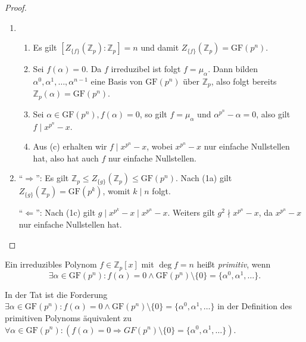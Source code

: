 \begin{proof}{\ }
    \begin{enumerate}
        \item \begin{enumerate}
            \item Es gilt $[Z_{\{f\}}(\mathbb{Z}_p) : \mathbb{Z}_p] = n$ und damit $Z_{\{f\}}(\mathbb{Z}_p) = \mathrm{GF}(p^n)$.
            \item Sei $f(\alpha) = 0$. Da $f$ irreduzibel ist folgt $f = \mu_\alpha$. Dann bilden $\alpha^0, \alpha^1, \hdots, \alpha^{n-1}$ eine Basis von $\mathrm{GF}(p^n)$ über $\mathbb{Z}_p$, also folgt bereits $\mathbb{Z}_p(\alpha) = \mathrm{GF}(p^n)$.
            \item Sei $\alpha \in \mathrm{GF}(p^n), f(\alpha) = 0$, so gilt $f = \mu_\alpha$ und $\alpha^{p^n} - \alpha = 0$, also gilt $f \mid x^{p^n} - x$.
            \item Aus (c) erhalten wir $f \mid x^{p^n} - x$, wobei $x^{p^n} - x$ nur einfache Nullstellen hat, also hat auch $f$ nur einfache Nullstellen.
        \end{enumerate}
        \item ``$\Rightarrow$'': Es gilt $\mathbb{Z}_p \leq Z_{\{g\}}(\mathbb{Z}_p) \leq \mathrm{GF}(p^n)$. Nach (1a) gilt $Z_{\{g\}}(\mathbb{Z}_p) = \mathrm{GF}(p^k)$, womit $k \mid n$ folgt.
        
        ``$\Leftarrow$'': Nach (1c) gilt $g \mid x^{p^k} - x \mid x^{p^n} - x$. Weiters gilt $g^2 \nmid x^{p^n} - x$, da $x^{p^n} - x$ nur einfache Nullstellen hat.
    \end{enumerate}
\end{proof}


\begin{definition}
    Ein irreduzibles Polynom $f \in \mathbb{Z}_p[x]$ mit $\deg f = n$ heißt \emph{primitiv}, wenn 
    $$\exists \alpha \in \mathrm{GF}(p^n): f(\alpha)=0 \land \mathrm{GF}(p^n)\setminus\{0\} = \{\alpha^0, \alpha^1, \ldots \}. $$
\end{definition}

\begin{remark}
    In der Tat ist die Forderung $\exists \alpha\in \mathrm{GF}(p^n):f(\alpha)=0\land \mathrm{GF}(p^n)\setminus\{0\}=\{\alpha^0,\alpha^1,\ldots\}$ in der Definition des primitiven Polynoms äquivalent zu $\forall\alpha\in\mathrm{GF}(p^n):(f(\alpha)=0\Rightarrow GF(p^n)\setminus\{0\}=\{\alpha^0,\alpha^1,\ldots\})$. 
\end{remark}

